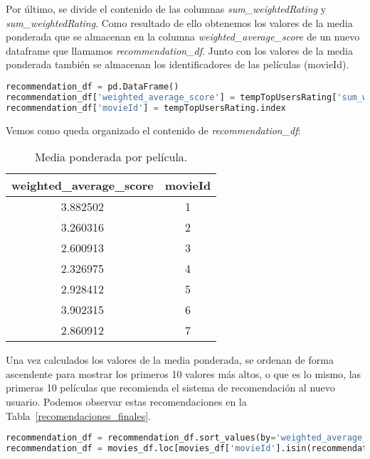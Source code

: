\documentclass{uimppracticas}
\begin{document}
Por último, se divide el contenido de las columnas \textit{sum\_weightedRating} y \textit{sum\_weightedRating}. Como resultado de ello obtenemos los valores de la media ponderada que se almacenan en la columna \textit{weighted\_average\_score} de un nuevo dataframe que llamamos \textit{recommendation\_df}. Junto con los valores de la media ponderada también se almacenan los identificadores de las películas (movieId).

\begin{lstlisting}[language=python, basicstyle=\small]
recommendation_df = pd.DataFrame()
recommendation_df['weighted_average_score'] = tempTopUsersRating['sum_weightedRating']/tempTopUsersRating['sum_similarityIndex']
recommendation_df['movieId'] = tempTopUsersRating.index
\end{lstlisting}

Vemos como queda organizado el contenido de \textit{recommendation\_df}:

\begin{table}[H]
	\centering
	\begin{tabular}{cc}
		\toprule
		weighted\_average\_score &  movieId \\
		\midrule
		3.882502 &        1 \\
		3.260316 &        2 \\
		2.600913 &        3 \\
		2.326975 &        4 \\
		2.928412 &        5 \\
		3.902315 &        6 \\
		2.860912 &        7 \\
		\bottomrule
	\end{tabular}
	\caption{Media ponderada por película.}
	\label{promedio_ponderado_resultado}
\end{table}

Una vez calculados los valores de la media ponderada, se ordenan de forma ascendente para mostrar los primeros 10 valores más altos, o que es lo mismo, las primeras 10 películas que recomienda el sistema de recomendación al nuevo usuario. Podemos observar estas recomendaciones en la Tabla~\ref{recomendaciones_finales}.

\begin{lstlisting}[language=python, basicstyle=\small]
recommendation_df = recommendation_df.sort_values(by='weighted_average_score', ascending=False)
recommendation_df = movies_df.loc[movies_df['movieId'].isin(recommendation_df.head(10)['movieId'].tolist())]
\end{lstlisting}
\end{document}
